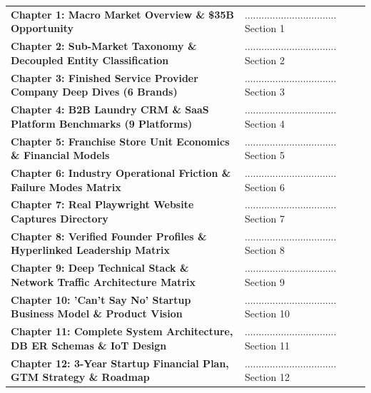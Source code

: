 \documentclass[11pt,a4paper]{article}
\begin{document}
\begin{titlepage}
    \begin{tcolorbox}[colback=lightbg,colframe=navyblue,title=\textbf{EXECUTIVE TABLE OF CONTENTS:}]
        \begin{tabular}{ll}
            \textbf{Chapter 1: Macro Market Overview \& \$35B Opportunity} & ................................. Section 1 \\
            \textbf{Chapter 2: Sub-Market Taxonomy \& Decoupled Entity Classification} & ................................. Section 2 \\
            \textbf{Chapter 3: Finished Service Provider Company Deep Dives (6 Brands)} & ................................. Section 3 \\
            \textbf{Chapter 4: B2B Laundry CRM \& SaaS Platform Benchmarks (9 Platforms)} & ................................. Section 4 \\
            \textbf{Chapter 5: Franchise Store Unit Economics \& Financial Models} & ................................. Section 5 \\
            \textbf{Chapter 6: Industry Operational Friction \& Failure Modes Matrix} & ................................. Section 6 \\
            \textbf{Chapter 7: Real Playwright Website Captures Directory} & ................................. Section 7 \\
            \textbf{Chapter 8: Verified Founder Profiles \& Hyperlinked Leadership Matrix} & ................................. Section 8 \\
            \textbf{Chapter 9: Deep Technical Stack \& Network Traffic Architecture Matrix} & ................................. Section 9 \\
            \textbf{Chapter 10: 'Can't Say No' Startup Business Model \& Product Vision} & ................................. Section 10 \\
            \textbf{Chapter 11: Complete System Architecture, DB ER Schemas \& IoT Design} & ................................. Section 11 \\
            \textbf{Chapter 12: 3-Year Startup Financial Plan, GTM Strategy \& Roadmap} & ................................. Section 12 \\
        \end{tabular}
    \end{tcolorbox}
    
    \vspace*{0.5cm}
\end{titlepage}
\end{document}
